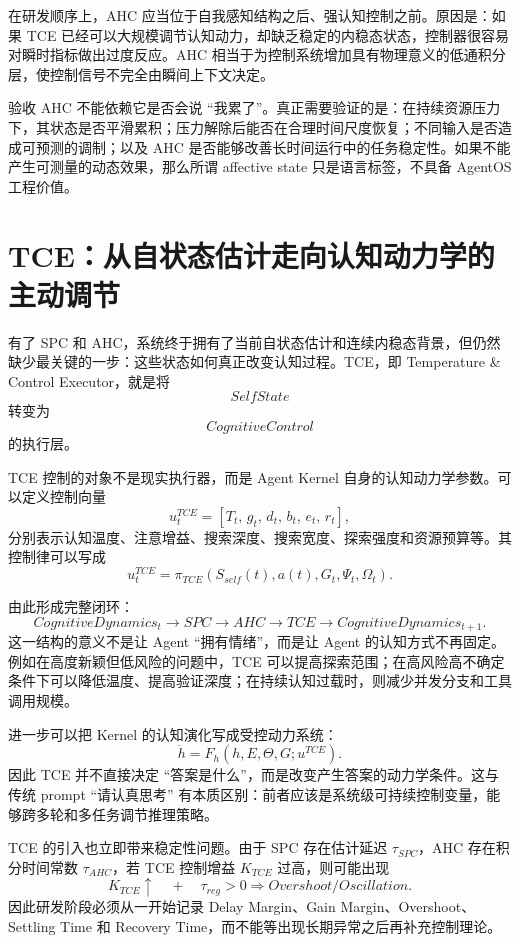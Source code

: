 在研发顺序上，AHC 应当位于自我感知结构之后、强认知控制之前。原因是：如果 TCE 已经可以大规模调节认知动力，却缺乏稳定的内稳态状态，控制器很容易对瞬时指标做出过度反应。AHC 相当于为控制系统增加具有物理意义的低通积分层，使控制信号不完全由瞬间上下文决定。

验收 AHC 不能依赖它是否会说 ``我累了''。真正需要验证的是：在持续资源压力下，其状态是否平滑累积；压力解除后能否在合理时间尺度恢复；不同输入是否造成可预测的调制；以及 AHC 是否能够改善长时间运行中的任务稳定性。如果不能产生可测量的动态效果，那么所谓 affective state 只是语言标签，不具备 AgentOS 工程价值。

\section{TCE：从自状态估计走向认知动力学的主动调节}

有了 SPC 和 AHC，系统终于拥有了当前自状态估计和连续内稳态背景，但仍然缺少最关键的一步：这些状态如何真正改变认知过程。TCE，即 Temperature \& Control Executor，就是将
\[
SelfState
\]
转变为
\[
CognitiveControl
\]
的执行层。

TCE 控制的对象不是现实执行器，而是 Agent Kernel 自身的认知动力学参数。可以定义控制向量
\[
u_t^{TCE}
=
[
T_t,\,
g_t,\,
d_t,\,
b_t,\,
e_t,\,
r_t
],
\]
分别表示认知温度、注意增益、搜索深度、搜索宽度、探索强度和资源预算等。其控制律可以写成
\[
u_t^{TCE}
=
\pi_{TCE}
(
S_{self}(t),
a(t),
G_t,
\Psi_t,
\Omega_t
).
\]

由此形成完整闭环：
\[
CognitiveDynamics_t
\rightarrow
SPC
\rightarrow
AHC
\rightarrow
TCE
\rightarrow
CognitiveDynamics_{t+1}.
\]
这一结构的意义不是让 Agent ``拥有情绪''，而是让 Agent 的认知方式不再固定。例如在高度新颖但低风险的问题中，TCE 可以提高探索范围；在高风险高不确定条件下可以降低温度、提高验证深度；在持续认知过载时，则减少并发分支和工具调用规模。

进一步可以把 Kernel 的认知演化写成受控动力系统：
\[
\dot h
=
F_h(
h,E,\Theta,G;
u^{TCE}
).
\]
因此 TCE 并不直接决定 ``答案是什么''，而是改变产生答案的动力学条件。这与传统 prompt ``请认真思考'' 有本质区别：前者应该是系统级可持续控制变量，能够跨多轮和多任务调节推理策略。

TCE 的引入也立即带来稳定性问题。由于 SPC 存在估计延迟 $\tau_{SPC}$，AHC 存在积分时间常数 $\tau_{AHC}$，若 TCE 控制增益 $K_{TCE}$ 过高，则可能出现
\[
K_{TCE}\uparrow
\quad+\quad
\tau_{reg}>0
\Rightarrow
Overshoot/Oscillation.
\]
因此研发阶段必须从一开始记录 Delay Margin、Gain Margin、Overshoot、Settling Time 和 Recovery Time，而不能等出现长期异常之后再补充控制理论。


